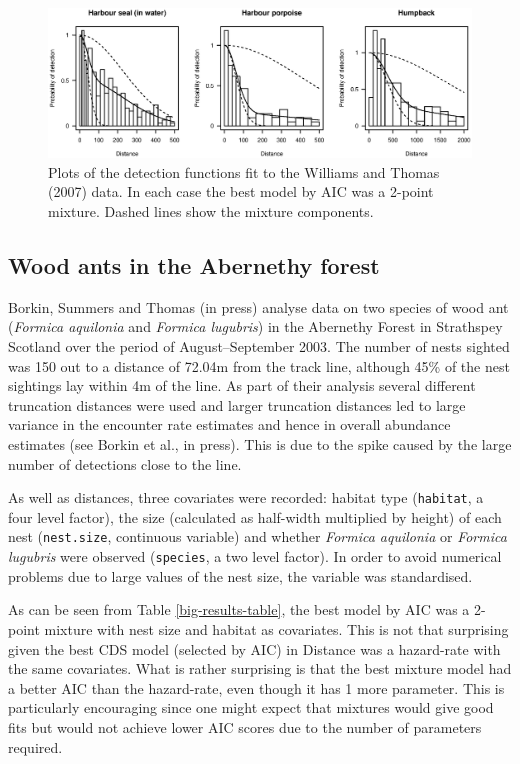 \documentclass[useAMS,referee, usegraphicx]{biom}
\begin{document}
\begin{figure}
\centering
\includegraphics[width=\textwidth]{analyses/williamsplots.eps}
\caption{Plots of the detection functions fit to the Williams and Thomas (2007) data. In each case the best model by AIC was a 2-point mixture. Dashed lines show the mixture components.}
\label{williams-detfcts}
\end{figure}


\subsection{Wood ants in the Abernethy forest}

Borkin, Summers and Thomas (in press) analyse data on two species of wood ant (\textit{Formica aquilonia} and \textit{Formica lugubris}) in the Abernethy Forest in Strathspey Scotland over the period of August--September 2003. The number of nests sighted was 150 out to a distance of 72.04m from the track line, although 45\% of the nest sightings lay within 4m of the line. As part of their analysis several different truncation distances were used and larger truncation distances led to large variance in the encounter rate estimates and hence in overall abundance estimates (see Borkin et al., in press). This is due to the spike caused by the large number of detections close to the line.

As well as distances, three covariates were recorded: habitat type (\texttt{habitat}, a four level factor), the size (calculated as half-width multiplied by height) of each nest (\texttt{nest.size}, continuous variable) and whether \textit{Formica aquilonia} or \textit{Formica lugubris} were observed (\texttt{species}, a two level factor). In order to avoid numerical problems due to large values of the nest size, the variable was standardised.

As can be seen from Table \ref{big-results-table}, the best model by AIC was a 2-point mixture with nest size and habitat as covariates. This is not that surprising given the best CDS model (selected by AIC) in Distance was a hazard-rate with the same covariates. What is rather surprising is that the best mixture model had a better AIC than the hazard-rate, even though it has 1 more parameter. This is particularly encouraging since one might expect that mixtures would give good fits but would not achieve lower AIC scores due to the number of parameters required.
\end{document}

